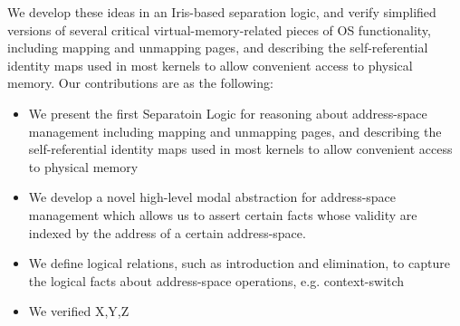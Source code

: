 We develop these ideas in an Iris-based separation logic, and verify simplified versions of several critical virtual-memory-related pieces of OS functionality, including mapping and unmapping pages, and describing the self-referential identity maps used in most kernels to allow convenient access to physical memory. Our contributions are as the following:
\begin{itemize}
\item We present the first Separatoin Logic for reasoning about address-space management including mapping and unmapping pages, and describing the self-referential identity maps used in most kernels to allow convenient access to physical memory 
\item We develop a novel high-level modal abstraction for address-space management which allows us to assert certain facts whose validity are indexed by the address of a certain address-space.
\item We define logical relations, such as introduction and elimination, to capture the logical facts about address-space operations, e.g. context-switch
\item We verified X,Y,Z
 \end{itemize}


